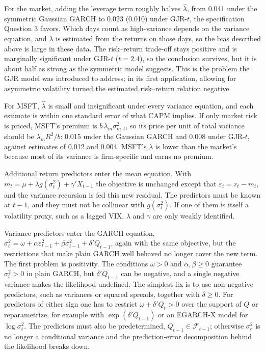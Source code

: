 \documentclass[11pt]{article}
\newcommand{\1}{\mathbf{1}}
\begin{document}
For the market, adding the leverage term roughly halves $\hat\lambda$, from 0.041 under the
symmetric Gaussian GARCH to 0.023 (0.010) under GJR-$t$, the specification Question 3 favors.
Which days count as high-variance depends on the variance equation, and $\lambda$ is estimated
from the returns on those days, so the bias described above is large in these data. The
risk--return trade-off stays positive and is marginally significant under GJR-$t$ ($t=2.4$), so
the conclusion survives, but it is about half as strong as the symmetric model suggests. This
is the problem the GJR model was introduced to address; in its first application, allowing for
asymmetric volatility turned the estimated risk--return relation negative.

For MSFT, $\hat\lambda$ is small and insignificant under every variance equation, and each
estimate is within one standard error of what CAPM implies. If only market risk is priced,
MSFT's premium is $b\,\lambda_m\sigma^2_{m,t}$, so its price per unit of total variance should
be $\lambda_m R^2/b$: 0.015 under the Gaussian GARCH and 0.008 under GJR-$t$, against estimates
of 0.012 and 0.004. MSFT's $\lambda$ is lower than the market's because most of its variance is
firm-specific and earns no premium.

Additional return predictors enter the mean equation. With
$m_t=\mu+\lambda g(\sigma_t^2)+\gamma'X_{t-1}$ the objective is unchanged except that
$\varepsilon_t=r_t-m_t$, and the variance recursion is fed this new residual. The predictors
must be known at $t-1$, and they must not be collinear with $g(\sigma_t^2)$. If one of them is
itself a volatility proxy, such as a lagged VIX, $\lambda$ and $\gamma$ are only weakly
identified.

Variance predictors enter the GARCH equation,
$\sigma_t^2=\omega+\alpha\varepsilon_{t-1}^2+\beta\sigma_{t-1}^2+\delta'Q_{t-1}$, again with
the same objective, but the restrictions that make plain GARCH well behaved no longer cover
the new term. The first problem is positivity. The conditions $\omega>0$ and $\alpha,\beta\ge0$
guarantee $\sigma_t^2>0$ in plain GARCH, but $\delta'Q_{t-1}$ can be negative, and a single
negative variance makes the likelihood undefined. The simplest fix is to use non-negative
predictors, such as variances or squared spreads, together with $\delta\ge0$. For predictors
of either sign one has to restrict $\omega+\delta'Q_t>0$ over the support of $Q$ or
reparametrize, for example with $\exp(\delta'Q_{t-1})$ or an EGARCH-X model for
$\log\sigma_t^2$. The predictors must also be predetermined, $Q_{t-1}\in\mathcal F_{t-1}$;
otherwise $\sigma_t^2$ is no longer a conditional variance and the prediction-error
decomposition behind the likelihood breaks down.
\end{document}
